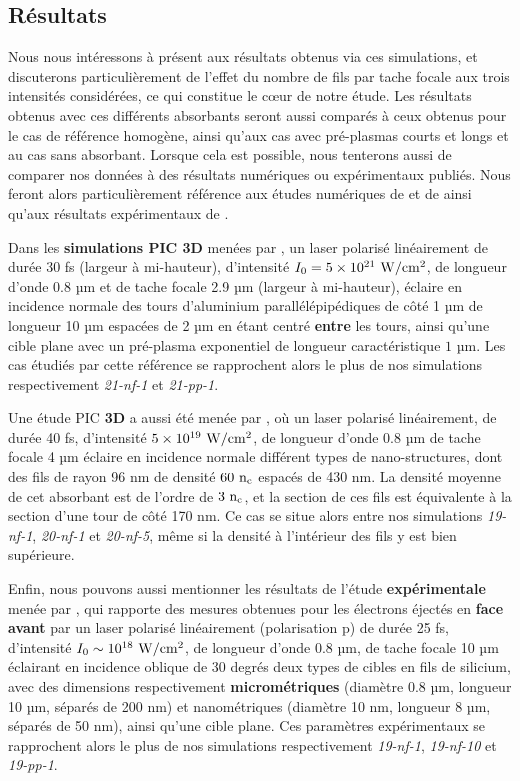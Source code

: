 \begin{refsection}
\subsection{Résultats}

Nous nous intéressons à présent aux résultats obtenus via ces simulations, et discuterons particulièrement de l'effet du nombre de fils par tache focale aux trois intensités considérées, ce qui constitue le cœur de notre étude. Les résultats obtenus avec ces différents absorbants seront aussi comparés à ceux obtenus pour le cas de référence homogène, ainsi qu'aux cas avec pré-plasmas courts et longs et au cas sans absorbant. Lorsque cela est possible, nous tenterons aussi de comparer nos données à des résultats numériques ou expérimentaux publiés. Nous feront alors particulièrement référence aux études numériques de \cite{jiang_2014} et de \cite{fedeli_2018c} ainsi qu'aux résultats expérimentaux de \cite{cristoforetti_2017}. 

Dans les \textbf{simulations PIC 3D} menées par \cite{jiang_2014}, un laser polarisé linéairement de durée 30 fs (largeur à mi-hauteur), d'intensité $I_0 = 5 \times 10^{21} ~ \rm W/cm^2$, de longueur d'onde 0.8 µm et de tache focale 2.9 µm (largeur à mi-hauteur), éclaire en incidence normale des tours d'aluminium parallélépipédiques de côté 1 µm de longueur 10 µm espacées de 2 µm en étant centré \textbf{entre} les tours, ainsi qu'une cible plane avec un pré-plasma exponentiel de longueur caractéristique $1$ µm. Les cas étudiés par cette référence se rapprochent alors le plus de nos simulations respectivement \textit{21-nf-1} et \textit{21-pp-1}. 

Une étude PIC \textbf{3D} a aussi été menée par \cite{fedeli_2018c}, où un laser polarisé linéairement, de durée 40 fs, d'intensité $5\times 10^{19} ~ \rm W/cm^2$, de longueur d'onde 0.8 µm de tache focale 4 µm éclaire en incidence normale différent types de nano-structures, dont des fils de rayon 96 nm de densité $60 ~ \rm n_c$ espacés de 430 nm. La densité moyenne de cet absorbant est de l'ordre de $3 ~ \rm n_c$, et la section de ces fils est équivalente à la section d'une tour de côté 170 nm. Ce cas se situe alors entre nos simulations \textit{19-nf-1}, \textit{20-nf-1} et \textit{20-nf-5}, même si la densité à l'intérieur des fils y est bien supérieure.

Enfin, nous pouvons aussi mentionner les résultats de l'étude \textbf{expérimentale} menée par \cite{cristoforetti_2017}, qui rapporte des mesures obtenues pour les électrons éjectés en \textbf{face avant} par un laser polarisé linéairement (polarisation p) de durée 25 fs, d'intensité $I_0 \sim 10^{18} ~ \rm W/cm^2$, de longueur d'onde 0.8 µm, de tache focale 10 µm éclairant en incidence oblique de 30 degrés deux types de cibles en fils de silicium, avec des dimensions respectivement \textbf{micrométriques} (diamètre 0.8 µm, longueur 10 µm, séparés de 200 nm) et nanométriques (diamètre 10 nm, longueur 8 µm, séparés de 50 nm), ainsi qu'une cible plane. Ces paramètres expérimentaux se rapprochent alors le plus de nos simulations respectivement \textit{19-nf-1}, \textit{19-nf-10} et \textit{19-pp-1}.


\end{refsection}

